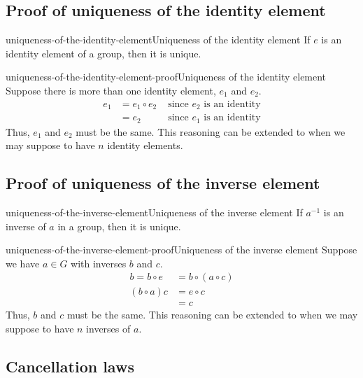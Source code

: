 \documentclass[preview]{standalone}
\begin{document}
\subsection{Proof of uniqueness of the identity element}

\begin{snippettheorem}{uniqueness-of-the-identity-element}{Uniqueness of the identity element}
    If \(e\) is an identity element of a group, then it is unique.
\end{snippettheorem}

\begin{snippetproof}{uniqueness-of-the-identity-element-proof}{Uniqueness of the identity element}
    Suppose there is more than one identity element, \(e_1\) and \(e_2\).
    \begin{align*}
        e_1 &= e_1 \circ e_2 &\text { since \(e_2\) is an identity} \\
        &= e_2 &\text { since \(e_1\) is an identity}
    \end{align*}
    Thus, \(e_1\) and \(e_2\) must be the same. This reasoning can be extended
    to when we may suppose to have \(n\) identity elements.
\end{snippetproof}

\subsection{Proof of uniqueness of the inverse element}

\begin{snippettheorem}{uniqueness-of-the-inverse-element}{Uniqueness of the inverse element}
    If \(a^{-1}\) is an inverse of \(a\) in a group, then it is unique.
\end{snippettheorem}

\begin{snippetproof}{uniqueness-of-the-inverse-element-proof}{Uniqueness of the inverse element}
    Suppose we have \(a\in G\) with inverses \(b\) and \(c\).
    \begin{align*}
        b = b \circ e &= b \circ (a \circ c)\\
        (b \circ a) c &= e \circ c \\
        &= c
    \end{align*}
    Thus, \(b\) and \(c\) must be the same. This reasoning can be extended
    to when we may suppose to have \(n\) inverses of \(a\).
\end{snippetproof}

\subsection{Cancellation laws}
\end{document}
